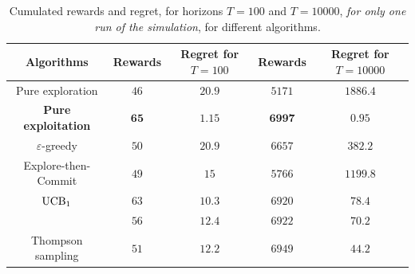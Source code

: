 \begin{table}[!h]
        \centering
        \begin{tabular}{c|cc|cc}
        \textbf{Algorithms}
        & Rewards
        & Regret for $T=100$
        & Rewards
        & Regret for $T=10000$ \\
            \hline
            Pure exploration
                & $46$ & $20.9$
                & $5171$ & $1886.4$ \\
            \textbf{Pure exploitation}
                & $\mathbf{65}$ & $\mathbf{1.15}$
                & $\mathbf{6997}$ & $\mathbf{0.95}$ \\
            \hline
            $\varepsilon$-greedy
                & $50$ & $20.9$
                & $6657$ & $382.2$ \\
            Explore-then-Commit
                & $49$ & $15$
                & $5766$ & $1199.8$ \\
            \hline
            $\mathrm{UCB}_1$
                & $63$ & $10.3$
                & $6920$ & $78.4$ \\
            \klUCB{}
                & $56$ & $12.4$
                & $6922$ & $70.2$ \\
            \hline
            Thompson sampling
                & $51$ & $12.2$
                & $6949$ & $44.2$ \\
        \end{tabular}
        \caption{Cumulated rewards and regret, for horizons $T=100$ and $T=10000$, \emph{for only one run of the simulation}, for different algorithms.}
        \label{table:2:oneShotResult}
\end{table}

